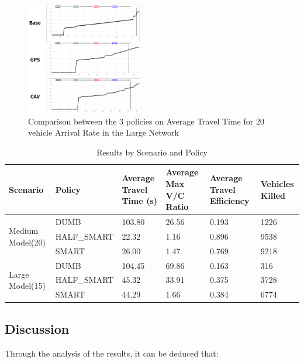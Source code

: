\begin{figure}
    \centering
    \includegraphics[width=0.45\textwidth]{img/att-20-large.png}
    \caption{Comparison between the 3 policies on Average Travel Time for 20 vehicle Arrival Rate in the Large Network}
    \label{fig:att-20-large}
\end{figure}

\begin{table}[h]
\centering
\caption{Results by Scenario and Policy}
\begin{tabularx}{\textwidth}{|l|l|X|X|X|X|}
\hline
\textbf{Scenario} & \textbf{Policy} & \textbf{Average Travel Time (s)} & \textbf{Average Max V/C Ratio} & \textbf{Average Travel Efficiency} & \textbf{Vehicles Killed} \\ \hline
\multirow{3}{*}{Medium Model(20)}  & DUMB       & 103.80 & 26.56 & 0.193 & 1226  \\ \cline{2-6} 
                               & HALF\_SMART & 22.32  & 1.16  & 0.896 & 9538  \\ \cline{2-6} 
                               & SMART      & 26.00  & 1.47  & 0.769 & 9218  \\ \hline
\multirow{3}{*}{Large Model(15)}   & DUMB       & 104.45 & 69.86 & 0.163 & 316   \\ \cline{2-6} 
                               & HALF\_SMART & 45.32  & 33.91 & 0.375 & 3728  \\ \cline{2-6} 
                               & SMART      & 44.29  & 1.66  & 0.384 & 6774  \\ \hline
\end{tabularx}
\label{tab:table}
\end{table}

\subsection{Discussion}

Through the analysis of the results, it can be deduced that:

